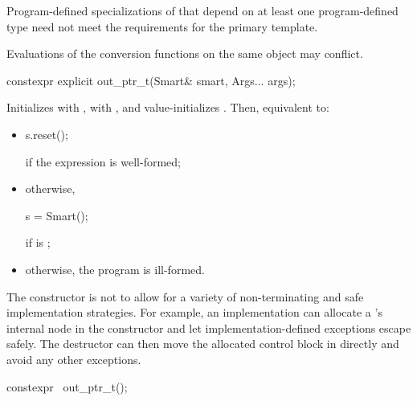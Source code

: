 \pnum
Program-defined specializations of 
that depend on at least one program-defined type
need not meet the requirements for the primary template.

\pnum
Evaluations of the conversion functions
on the same object may conflict.

%
\begin{itemdecl}
constexpr explicit out_ptr_t(Smart& smart, Args... args);
\end{itemdecl}

\begin{itemdescr}
\pnum
\effects
Initializes  with ,
 with , and
value-initializes .
Then, equivalent to:
\begin{itemize}
\item
\mbox{}\vspace{-\baselineskip}\vspace{-\parskip}
\begin{codeblock}
s.reset();
\end{codeblock}
if the expression  is well-formed;

\item
otherwise,
\begin{codeblock}
s = Smart();
\end{codeblock}
if  is ;

\item
otherwise, the program is ill-formed.
\end{itemize}

\pnum
\begin{note}
The constructor is not 
to allow for a variety of non-terminating and safe implementation strategies.
For example, an implementation can allocate
a 's internal node in the constructor and
let implementation-defined exceptions escape safely.
The destructor can then move the allocated control block in directly and
avoid any other exceptions.
\end{note}
\end{itemdescr}

%
\begin{itemdecl}
constexpr ~out_ptr_t();
\end{itemdecl}

